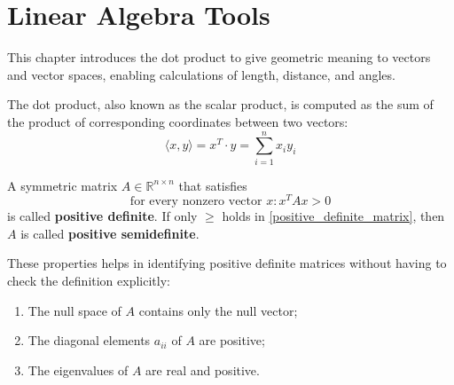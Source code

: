\documentclass{article}
\begin{document}
\section{Linear Algebra Tools}
This chapter introduces the dot product to give geometric meaning to vectors
and vector spaces, enabling calculations of length, distance, and angles.
\begin{definition}
    The dot product, also known as the scalar product, is computed as the sum
    of the product of corresponding coordinates between two vectors: 
    $$\langle x,y\rangle=x^T\cdot y=\displaystyle\sum_{i=1}^{n}x_iy_i$$
\end{definition}
\begin{definition} 
    A symmetric matrix $A\in \mathbb{R}^{n\times n}$ that satisfies
    \begin{equation}\label{positive_definite_matrix}
        \text{for every nonzero vector }x:x^TAx>0
    \end{equation}    
    is called \textbf{positive definite}. If only $\geq$ holds in
    \ref{positive_definite_matrix}, then $A$ is called \textbf{positive
    semidefinite}.
\end{definition}
These properties helps in identifying positive definite matrices without
having to check the definition explicitly:
\begin{enumerate}
    \item The null space of $A$ contains only the null vector; 
    \item The diagonal elements $a_{ii}$ of $A$ are positive; 
    \item The eigenvalues of $A$ are real and positive.
\end{enumerate}
\end{document}
